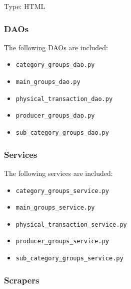 {\begin{itemize}
		Type: HTML


	\end{itemize}

	\subsubsection{DAOs}

	The following DAOs are included:

	\begin{itemize}
		\item \texttt{category\_groups\_dao.py}


		\item \texttt{main\_groups\_dao.py}


		\item \texttt{physical\_transaction\_dao.py}


		\item \texttt{producer\_groups\_dao.py}


		\item \texttt{sub\_category\_groups\_dao.py}

	\end{itemize}

	\subsubsection{Services}

	The following services are included:

	\begin{itemize}
		\item \texttt{category\_groups\_service.py}


		\item \texttt{main\_groups\_service.py}


		\item \texttt{physical\_transaction\_service.py}


		\item \texttt{producer\_groups\_service.py}


		\item \texttt{sub\_category\_groups\_service.py}

	\end{itemize}

	\subsubsection{Scrapers}

}

